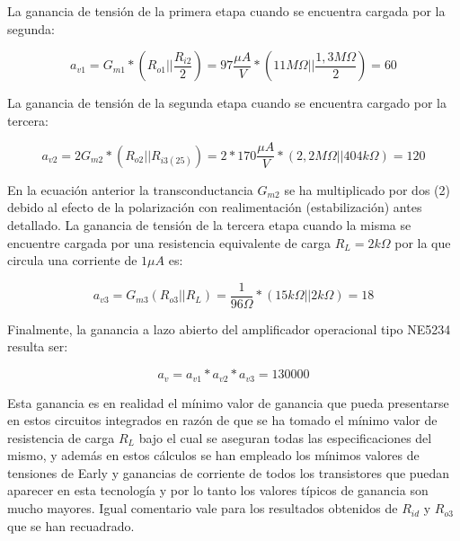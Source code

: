 \documentclass[12pt,a4paper,final,headinclude,footinclude,BCOR5mm]{scrartcl}
\begin{document}
La ganancia de tensión de la primera etapa cuando se encuentra cargada por la segunda:

$$a_{v1} = G_{m1} * (R_{o1} || \frac{R_{i2}}{2}) = 97 \frac{\mu A}{V} * (11 M\Omega || \frac{1,3 M\Omega}{2}) = 60$$

La ganancia de tensión de la segunda etapa cuando se encuentra cargado por la tercera:

$$a_{v2} = 2 G_{m2} * (R_{o2} || R_{i3(25)}) = 2 * 170 \frac{\mu A}{V} * (2,2 M\Omega || 404 k\Omega) = 120 $$

En la ecuación anterior la transconductancia $G_{m2}$ se ha multiplicado por dos (2) debido al efecto de la polarización con realimentación (estabilización) antes detallado. La ganancia de tensión de la tercera etapa cuando la misma se encuentre cargada por una resistencia equivalente de carga $R_{L} = 2 k\Omega$ por la que circula una corriente de $1 \mu A$ es:

$$a_{v3} = G_{m3}(R_{o3}||R_{L}) = \frac{1}{96 \Omega}*(15 k\Omega || 2 k\Omega) = 18$$

Finalmente, la ganancia a lazo abierto del amplificador operacional tipo NE5234 resulta ser:

$$a_{v} = a_{v1}*a_{v2}*a_{v3} = 130000$$

Esta ganancia es en realidad el mínimo valor de ganancia que pueda presentarse en estos circuitos integrados en razón de que se ha tomado el mínimo valor de resistencia de carga $R_{L}$ bajo el cual se aseguran todas las especificaciones del mismo, y además en estos cálculos se han empleado los mínimos valores de tensiones de Early y ganancias de corriente de todos los transistores que puedan aparecer en esta tecnología y por lo tanto los valores típicos de ganancia son mucho mayores. Igual comentario vale para los resultados obtenidos de $R_{id}$ y $R_{o3}$ que se han recuadrado.
\end{document}

